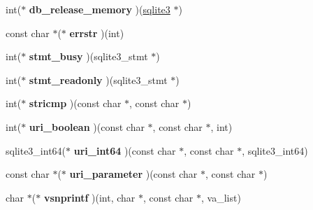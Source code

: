 \begin{DoxyCompactItemize}
\item 
int($\ast$ {\bfseries db\+\_\+release\+\_\+memory} )(\hyperlink{structsqlite3}{sqlite3} $\ast$)\hypertarget{structsqlite3__api__routines_ae2363076a42752e78fbbd95df7d904f2}{}\label{structsqlite3__api__routines_ae2363076a42752e78fbbd95df7d904f2}

\item 
const char $\ast$($\ast$ {\bfseries errstr} )(int)\hypertarget{structsqlite3__api__routines_abe13e230a5758742b704f4361c20836c}{}\label{structsqlite3__api__routines_abe13e230a5758742b704f4361c20836c}

\item 
int($\ast$ {\bfseries stmt\+\_\+busy} )(sqlite3\+\_\+stmt $\ast$)\hypertarget{structsqlite3__api__routines_acb29457d970ab9854d35446f207933e4}{}\label{structsqlite3__api__routines_acb29457d970ab9854d35446f207933e4}

\item 
int($\ast$ {\bfseries stmt\+\_\+readonly} )(sqlite3\+\_\+stmt $\ast$)\hypertarget{structsqlite3__api__routines_a6d2a2daec1f9215ac15ac9c941919248}{}\label{structsqlite3__api__routines_a6d2a2daec1f9215ac15ac9c941919248}

\item 
int($\ast$ {\bfseries stricmp} )(const char $\ast$, const char $\ast$)\hypertarget{structsqlite3__api__routines_a0e2d9055bbe019f4232902c413c240d5}{}\label{structsqlite3__api__routines_a0e2d9055bbe019f4232902c413c240d5}

\item 
int($\ast$ {\bfseries uri\+\_\+boolean} )(const char $\ast$, const char $\ast$, int)\hypertarget{structsqlite3__api__routines_a5b22d69516c01562f7e5bfa61a5a09e4}{}\label{structsqlite3__api__routines_a5b22d69516c01562f7e5bfa61a5a09e4}

\item 
sqlite3\+\_\+int64($\ast$ {\bfseries uri\+\_\+int64} )(const char $\ast$, const char $\ast$, sqlite3\+\_\+int64)\hypertarget{structsqlite3__api__routines_a03be0cdc22e246acc8c0fc15a7be4b24}{}\label{structsqlite3__api__routines_a03be0cdc22e246acc8c0fc15a7be4b24}

\item 
const char $\ast$($\ast$ {\bfseries uri\+\_\+parameter} )(const char $\ast$, const char $\ast$)\hypertarget{structsqlite3__api__routines_a54befd2fff5d4cddcf2bdb05df470f9b}{}\label{structsqlite3__api__routines_a54befd2fff5d4cddcf2bdb05df470f9b}

\item 
char $\ast$($\ast$ {\bfseries vsnprintf} )(int, char $\ast$, const char $\ast$, va\+\_\+list)\hypertarget{structsqlite3__api__routines_ad1f8c7c0b8a41360b3da6238f169f2b9}{}\label{structsqlite3__api__routines_ad1f8c7c0b8a41360b3da6238f169f2b9}


\end{DoxyCompactItemize}
